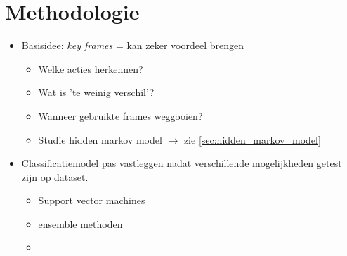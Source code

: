\chapter{Methodologie}
\label{ch:methodologie}

\begin{itemize}
	\item Basisidee: \textit{key frames} = kan zeker voordeel brengen
	\begin{itemize}
		\item Welke acties herkennen?  
		\item Wat is 'te weinig verschil'? 
		\item Wanneer gebruikte frames weggooien? 
		\item Studie hidden markov model $\rightarrow$ zie \ref{sec:hidden_markov_model}
	\end{itemize}
	\item Classificatiemodel pas vastleggen nadat verschillende mogelijkheden getest zijn op dataset.
	\begin{itemize}
		\item Support vector machines
		\item ensemble methoden
		\item {}
	\end{itemize}
\end{itemize}